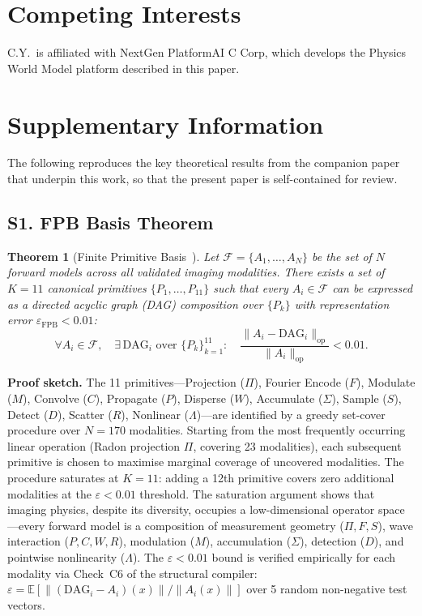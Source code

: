 \documentclass[11pt,a4paper]{article}
\newtheorem{theorem}{Theorem}
\newcommand{\eps}{\varepsilon}
\begin{document}
\section*{Competing Interests}

C.Y.\ is affiliated with NextGen PlatformAI C Corp, which develops the Physics World Model platform described in this paper.

\section*{Supplementary Information}

The following reproduces the key theoretical results from the companion paper~\cite{paperII} that underpin this work, so that the present paper is self-contained for review.

\subsection*{S1. FPB Basis Theorem}

\begin{theorem}[Finite Primitive Basis~\cite{paperII}]
\label{thm:fpb}
Let $\mathcal{F} = \{A_1, \ldots, A_N\}$ be the set of $N$ forward models across all validated imaging modalities.  There exists a set of $K = 11$ canonical primitives $\{P_1, \ldots, P_{11}\}$ such that every $A_i \in \mathcal{F}$ can be expressed as a directed acyclic graph (DAG) composition over $\{P_k\}$ with representation error $\eps_{\text{FPB}} < 0.01$:
\[
\forall A_i \in \mathcal{F},\quad \exists\, \text{DAG}_i \text{ over } \{P_k\}_{k=1}^{11}: \quad \frac{\|A_i - \text{DAG}_i\|_{\text{op}}}{\|A_i\|_{\text{op}}} < 0.01.
\]
\end{theorem}

\textbf{Proof sketch.}
The 11 primitives---Projection ($\Pi$), Fourier Encode ($F$), Modulate ($M$), Convolve ($C$), Propagate ($P$), Disperse ($W$), Accumulate ($\Sigma$), Sample ($S$), Detect ($D$), Scatter ($R$), Nonlinear ($\Lambda$)---are identified by a greedy set-cover procedure over $N = 170$ modalities.  Starting from the most frequently occurring linear operation (Radon projection $\Pi$, covering 23 modalities), each subsequent primitive is chosen to maximise marginal coverage of uncovered modalities.  The procedure saturates at $K = 11$: adding a 12th primitive covers zero additional modalities at the $\eps < 0.01$ threshold.  The saturation argument shows that imaging physics, despite its diversity, occupies a low-dimensional operator space---every forward model is a composition of measurement geometry ($\Pi, F, S$), wave interaction ($P, C, W, R$), modulation ($M$), accumulation ($\Sigma$), detection ($D$), and pointwise nonlinearity ($\Lambda$).  The $\eps < 0.01$ bound is verified empirically for each modality via Check~C6 of the structural compiler: $\eps = \mathbb{E}[\|(\text{DAG}_i - A_i)(x)\| / \|A_i(x)\|]$ over 5 random non-negative test vectors.
\end{document}
